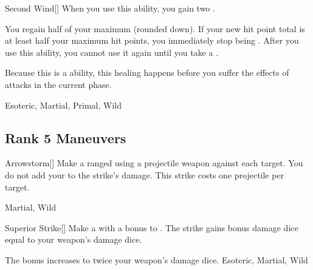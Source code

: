 \lowercase{\hypertarget{maneuver:Second Wind}{}}\label{maneuver:Second Wind}
\hypertarget{maneuver:Second Wind}{}
\begin{freeability}[Rank 4]{Second Wind}[]
When you use this ability, you gain two .

You regain half of your maximum  (rounded down).
If your new hit point total is at least half your maximum hit points, you immediately stop being .
After you use this ability, you cannot use it again until you take a .

Because this is a  ability, this healing happens before you suffer the effects of attacks in the current phase.


 Esoteric, Martial, Primal, Wild
\end{freeability}
\vspace{0.25em}


\subsection{Rank 5 Maneuvers}

\lowercase{\hypertarget{maneuver:Arrowstorm}{}}\label{maneuver:Arrowstorm}
\hypertarget{maneuver:Arrowstorm}{}
\begin{freeability}[Rank 5]{Arrowstorm}[]
Make a ranged  using a projectile weapon against each target.
You do not add your  to the strike's damage.
This strike costs one projectile per target.


 Martial, Wild
\end{freeability}
\vspace{0.25em}



\lowercase{\hypertarget{maneuver:Superior Strike}{}}\label{maneuver:Superior Strike}
\hypertarget{maneuver:Superior Strike}{}
\begin{freeability}[Rank 5]{Superior Strike}[]
Make a  with a  bonus to .
The strike gains bonus damage dice equal to your weapon's damage dice.

\rankline
{} The bonus increases to twice your weapon's damage dice.
 Esoteric, Martial, Wild
\end{freeability}
\vspace{0.25em}



